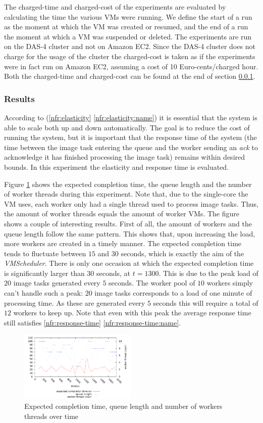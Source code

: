\documentclass[10pt,journal,compsoc]{IEEEtran}
\def\namedref#1{\ref{#1} \ref{#1:name}}
\begin{document}
The charged-time and charged-cost of the experiments are evaluated by
calculating the time the various VMs were running. We define the start of a run
as the moment at which the VM was created or resumed, and the end of a run the
moment at which a VM was suspended or deleted. The experiments are run on the
DAS-4 cluster and not on Amazon EC2. Since the DAS-4 cluster does not charge for
the usage of the cluster the charged-cost is taken as if the experiments were in
fact run on Amazon EC2, assuming a cost of 10 Euro-cents/charged hour. Both the
charged-time and charged-cost can be found at the end of section
\ref{sssec:experiment-result}.


\subsubsection{Results}
\label{sssec:experiment-result}
According to (\namedref{nfr:elasticity}) it is essential that the system is able
to scale both up and down automatically. The goal is to reduce the cost of
running the system, but it is important that the response time of the system
(the time between the image task entering the queue and the worker sending an
\emph{ack} to acknowledge it has finished processing the image task) remains within
desired bounds. In this experiment the elasticity and response time is
evaluated.

Figure \ref{fig:exp1.1} shows the expected completion time, the queue length and
the number of worker threads during this experiment. Note that, due
to the single-core the VM uses, each worker only had a single thread used to
process image tasks. Thus, the amount of worker threads equals the amount of worker
VMs. The figure shows a couple of interesting results. First of all, the amount
of workers and the queue length follow the same pattern. This shows that, upon
increasing the load, more workers are created in a timely manner. The expected
completion time tends to fluctuate between $15$ and $30$ seconds, which is
exactly the aim of the \emph{VMScheduler}. There is only one occasion at which
the expected completion time is significantly larger than $30$ seconds, at
$t=1300$. This is due to the peak load of $20$ image tasks generated every $5$
seconds. The worker pool of $10$ workers simply can't handle such a peak: $20$
image tasks corresponds to a load of one minute of processing time. As these are
generated every $5$ seconds this will require a total of $12$ workers to keep
up. Note that even with this peak the average response time still satisfies
\namedref{nfr:response-time}.
\begin{figure}
    \centering  
    \includegraphics[width=0.5\textwidth]{../plot_data/plot1.pdf}
    \caption{Expected completion time, queue length and number of
    workers threads over time}
    \label{fig:exp1.1}
\end{figure}
\end{document}
